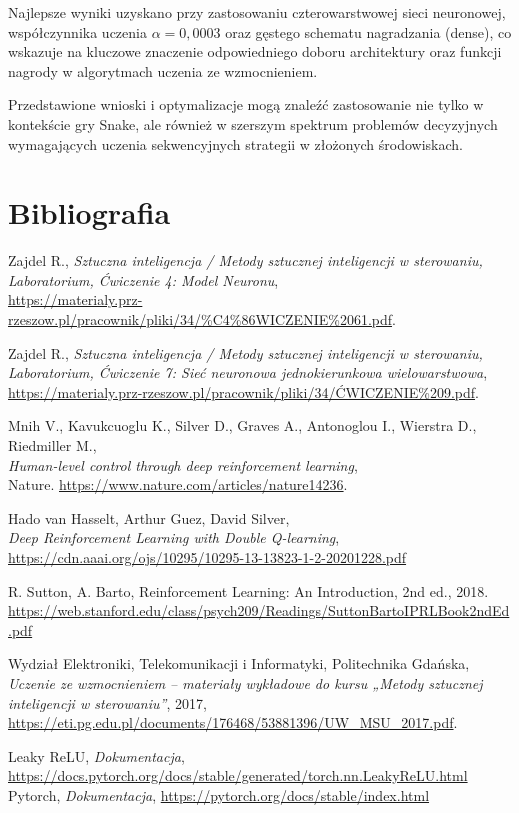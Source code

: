 \documentclass[a4paper,12pt]{article}
\begin{document}
Najlepsze wyniki uzyskano przy zastosowaniu czterowarstwowej sieci neuronowej, współczynnika uczenia \(\alpha = 0{,}0003\) oraz gęstego schematu nagradzania (dense), co wskazuje na kluczowe znaczenie odpowiedniego doboru architektury oraz funkcji nagrody w algorytmach uczenia ze wzmocnieniem.

Przedstawione wnioski i optymalizacje mogą znaleźć zastosowanie nie tylko w kontekście gry Snake, ale również w szerszym spektrum problemów decyzyjnych wymagających uczenia sekwencyjnych strategii w złożonych środowiskach.  

\clearpage
\section{Bibliografia}  
\renewcommand{\refname}{Literatura}
\begin{thebibliography}{9}

Zajdel R., \textit{Sztuczna inteligencja / Metody sztucznej inteligencji w sterowaniu, Laboratorium, Ćwiczenie 4: Model Neuronu},\\
\url{https://materialy.prz-rzeszow.pl/pracownik/pliki/34/%C4%86WICZENIE%2061.pdf}.

Zajdel R., \textit{Sztuczna inteligencja / Metody sztucznej inteligencji w sterowaniu, Laboratorium, Ćwiczenie 7: Sieć neuronowa jednokierunkowa wielowarstwowa},\\
\url{https://materialy.prz-rzeszow.pl/pracownik/pliki/34/ĆWICZENIE%209.pdf}.

Mnih V., Kavukcuoglu K., Silver D., Graves A., Antonoglou I., Wierstra D., Riedmiller M.,\\
\textit{Human-level control through deep reinforcement learning},\\
Nature.
\url{https://www.nature.com/articles/nature14236}.

Hado van Hasselt, Arthur Guez, David Silver, \\
\textit{Deep Reinforcement Learning with Double Q-learning},\\
\url{https://cdn.aaai.org/ojs/10295/10295-13-13823-1-2-20201228.pdf}

R. Sutton, A. Barto, Reinforcement Learning: An Introduction, 2nd ed., 2018. \url{https://web.stanford.edu/class/psych209/Readings/SuttonBartoIPRLBook2ndEd.pdf}

Wydział Elektroniki, Telekomunikacji i Informatyki, Politechnika Gdańska, \emph{Uczenie ze wzmocnieniem – materiały wykładowe do kursu „Metody sztucznej inteligencji w sterowaniu”}, 2017, \url{https://eti.pg.edu.pl/documents/176468/53881396/UW_MSU_2017.pdf}.

Leaky ReLU, \textit{Dokumentacja}, \url{https://docs.pytorch.org/docs/stable/generated/torch.nn.LeakyReLU.html} \\

Pytorch, \textit{Dokumentacja}, \url{https://pytorch.org/docs/stable/index.html} \\



\end{thebibliography}
\end{document}
